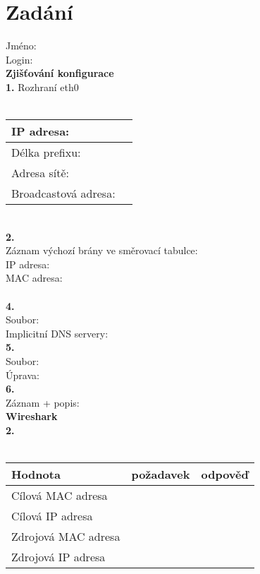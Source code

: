 \section{Zadání}
Jméno:\\
Login:\\

\textbf{Zjišťování konfigurace}\\
\textbf{1.} Rozhraní eth0\\
\\
\begin{tabular}{|l|r|}
\hline
IP adresa: & \hspace{12em} \\
\hline
Délka prefixu: & \\
\hline
Adresa sítě: & \\
\hline
Broadcastová adresa: & \\
\hline
\end{tabular}
\vspace{1.5em}
\\
\textbf{2.}\\
\vspace{3em}
Záznam výchozí brány ve směrovací tabulce:\\
IP adresa:\\
MAC adresa:\\
\\
\textbf{4.}\\
Soubor:\\
\vspace{8em}
Implicitní DNS servery:\\
\textbf{5.}\\
Soubor:\\
\vspace{4em}
Úprava:\\
\newpage
\noindent
\textbf{6.}\\
\vspace{5em}
Záznam + popis:\\
\noindent
\textbf{Wireshark}\\
\textbf{2.}\\
\\
\begin{tabular}{|l|c|c|}
\hline
\textbf{Hodnota} & \textbf{požadavek} & \textbf{odpověď}\\
\hline
Cílová MAC adresa & \hspace{10em} & \hspace{10em} \\
\hline
Cílová IP adresa & & \\
\hline
Zdrojová MAC adresa & & \\
\hline
Zdrojová IP adresa & & \\
\hline
\end{tabular}
